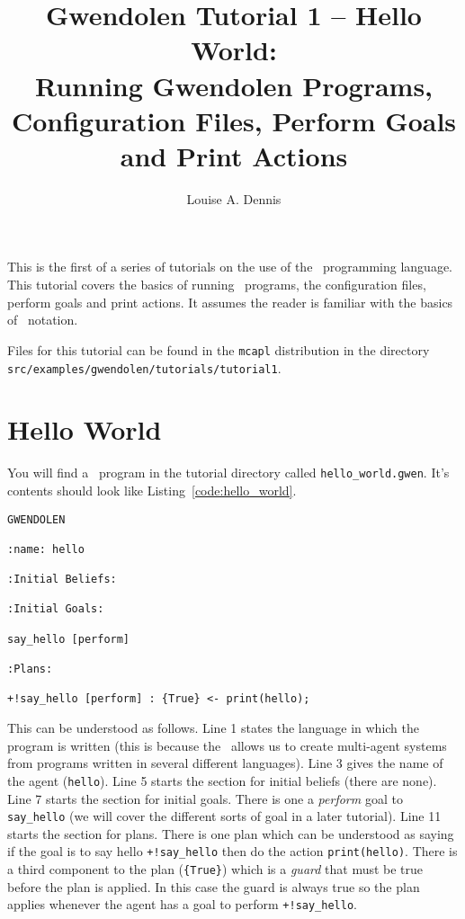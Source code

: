 \documentclass[a4]{article}
\author{Louise A. Dennis}
\title{Gwendolen Tutorial 1 -- Hello World: \\
Running Gwendolen Programs, Configuration Files, Perform Goals and Print Actions}
\begin{document}
\maketitle
This is the first of a series of tutorials on the use of the \gwendolen\ programming language.  This tutorial covers the basics of running \gwendolen\ programs, the configuration files, perform goals and print actions.  It assumes the reader is familiar with the basics of \prolog\ notation.

Files for this tutorial can be found in the \texttt{mcapl} distribution in the directory \texttt{src/examples/gwendolen/tutorials/tutorial1}.

\section{Hello World}

You will find a \gwendolen\ program in the tutorial directory called \texttt{hello\_world.gwen}.  It's contents should look like Listing~\ref{code:hello_world}.
\begin{lstlisting}[float,caption=Hello World,basicstyle=\sffamily,style=easslisting,language=Gwendolen,label=code:hello_world]
GWENDOLEN

:name: hello

:Initial Beliefs:

:Initial Goals:

say_hello [perform]

:Plans:

+!say_hello [perform] : {True} <- print(hello);
\end{lstlisting}

This can be understood as follows.  Line 1 states the language in which the program is written (this is because the \ail\ allows us to create multi-agent systems from programs written in several different languages).  Line 3 gives the name of the agent (\lstinline{hello}).  Line 5 starts the section for initial beliefs (there are none).  Line 7 starts the section for initial goals.  There is one a \emph{perform} goal to \lstinline{say_hello} (we will cover the different sorts of goal in a later tutorial).  Line 11 starts the section for plans.  There is one plan which can be understood as saying if the goal is to say hello \lstinline{+!say_hello} then do the action \lstinline{print(hello)}.  There is a third component to the plan (\lstinline+{True}+) which is a \emph{guard} that must be true before the plan is applied.  In this case the guard is always true so the plan applies whenever the agent has a goal to perform \lstinline{+!say_hello}.
\end{document}
